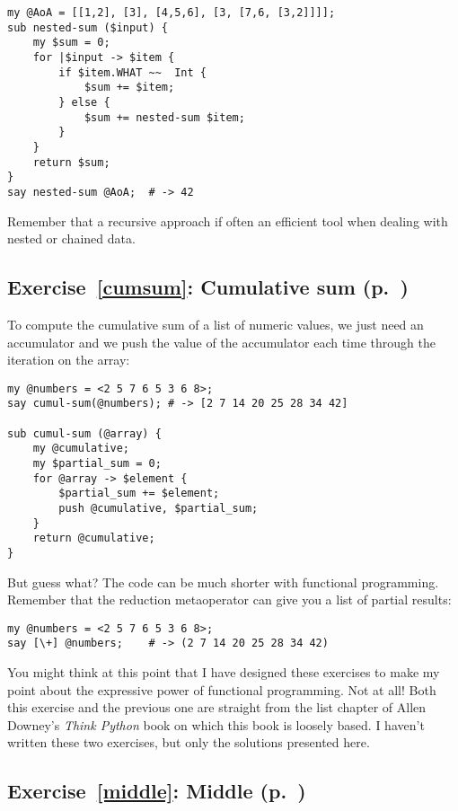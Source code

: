 \begin{verbatim}
my @AoA = [[1,2], [3], [4,5,6], [3, [7,6, [3,2]]]];
sub nested-sum ($input) { 
    my $sum = 0; 
    for |$input -> $item { 
        if $item.WHAT ~~  Int {
            $sum += $item;
        } else {
            $sum += nested-sum $item;
        }
    } 
    return $sum;
}
say nested-sum @AoA;  # -> 42
\end{verbatim}

Remember that a recursive approach if often an efficient 
tool when dealing with nested or chained data. 

\subsection{Exercise~\ref{cumsum}: Cumulative sum (p.~\pageref{cumsum})}
\label{sol_cumsum}

To compute the cumulative sum of a list of numeric values, 
we just need an accumulator and we push the value of 
the accumulator each time through the iteration 
on the array:

\begin{verbatim}
my @numbers = <2 5 7 6 5 3 6 8>;
say cumul-sum(@numbers); # -> [2 7 14 20 25 28 34 42]

sub cumul-sum (@array) {
    my @cumulative;
    my $partial_sum = 0;
    for @array -> $element {
        $partial_sum += $element;
        push @cumulative, $partial_sum;
    }
    return @cumulative;
}
\end{verbatim}

But guess what? The code can be much shorter with 
functional programming. Remember that the reduction 
metaoperator can give you a list of partial results:

\begin{verbatim}
my @numbers = <2 5 7 6 5 3 6 8>;
say [\+] @numbers;    # -> (2 7 14 20 25 28 34 42)
\end{verbatim}

You might think at this point that I have designed these 
exercises to make my point about the expressive power 
of functional programming. Not at all! Both this 
exercise and the previous one are straight from 
the list chapter of Allen Downey's \emph{Think Python} 
book on which this book is loosely based. 
I haven't written these two exercises, but only the 
solutions presented here.


\subsection{Exercise~\ref{middle}: Middle (p.~\pageref{middle})}
\label{sol_middle}

